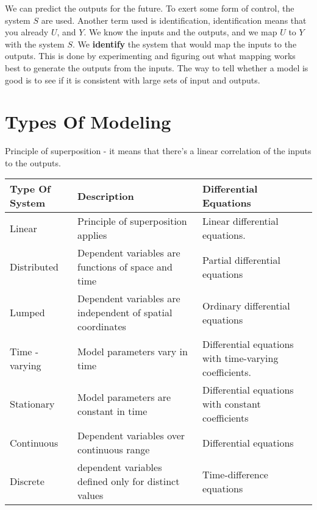 \documentclass[11pt]{report}
\begin{document}
We can predict the outputs for the future. To exert some form of control, the system \(S\) are used. Another term used is identification, identification means that you already \(U\), and \(Y\). We know the inputs and the outputs, and we map \(U\) to \(Y\) with the system \(S\). We \textbf{identify} the system that would map the inputs to the outputs. This is done by experimenting and figuring out what mapping works best to generate the outputs from the inputs. The way to tell whether a model is good is to see if it is consistent with large sets of input and outputs.
\section{Types Of Modeling}
\label{sec:org1d085aa}
Principle of superposition - it means that there's a linear correlation of the inputs to the outputs.
\begin{center}
\begin{tabular}{lll}
\hline
Type Of System & Description & Differential Equations\\
\hline
Linear & Principle of superposition applies & Linear differential equations.\\
Distributed & Dependent variables are functions of space and time & Partial differential equations\\
Lumped & Dependent variables are independent of spatial coordinates & Ordinary differential equations\\
Time - varying & Model parameters vary in time & Differential equations with time-varying coefficients.\\
Stationary & Model parameters are constant in time & Differential equations with constant coefficients\\
Continuous & Dependent variables over continuous range & Differential equations\\
Discrete & dependent variables defined only for distinct values & Time-difference equations\\
\hline
\end{tabular}
\end{center}
\end{document}
